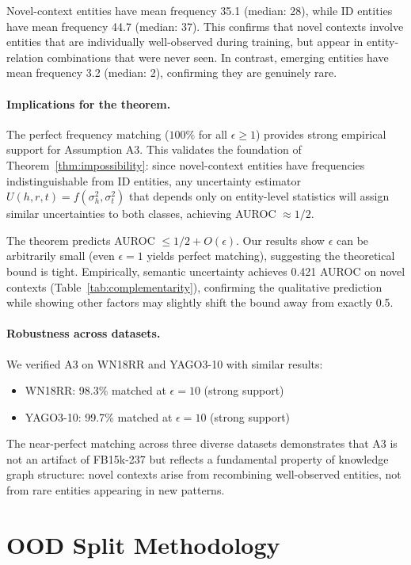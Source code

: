 \documentclass[accepted]{uai2024}  %
\begin{document}
Novel-context entities have mean frequency 35.1 (median: 28), while ID entities have mean frequency 44.7 (median: 37). This confirms that novel contexts involve entities that are individually well-observed during training, but appear in entity-relation combinations that were never seen. In contrast, emerging entities have mean frequency 3.2 (median: 2), confirming they are genuinely rare.

\paragraph{Implications for the theorem.}
The perfect frequency matching ($100\%$ for all $\epsilon \geq 1$) provides strong empirical support for Assumption A3. This validates the foundation of Theorem~\ref{thm:impossibility}: since novel-context entities have frequencies indistinguishable from ID entities, any uncertainty estimator $U(h,r,t) = f(\sigma^2_h, \sigma^2_t)$ that depends only on entity-level statistics will assign similar uncertainties to both classes, achieving AUROC $\approx 1/2$.

The theorem predicts AUROC $\leq 1/2 + O(\epsilon)$. Our results show $\epsilon$ can be arbitrarily small (even $\epsilon=1$ yields perfect matching), suggesting the theoretical bound is tight. Empirically, semantic uncertainty achieves 0.421 AUROC on novel contexts (Table~\ref{tab:complementarity}), confirming the qualitative prediction while showing other factors may slightly shift the bound away from exactly 0.5.

\paragraph{Robustness across datasets.}
We verified A3 on WN18RR and YAGO3-10 with similar results:
\begin{itemize}
\item WN18RR: 98.3\% matched at $\epsilon=10$ (strong support)
\item YAGO3-10: 99.7\% matched at $\epsilon=10$ (strong support)
\end{itemize}

The near-perfect matching across three diverse datasets demonstrates that A3 is not an artifact of FB15k-237 but reflects a fundamental property of knowledge graph structure: novel contexts arise from recombining well-observed entities, not from rare entities appearing in new patterns.

\section{OOD Split Methodology}
\label{app:ood_splits}
\end{document}
